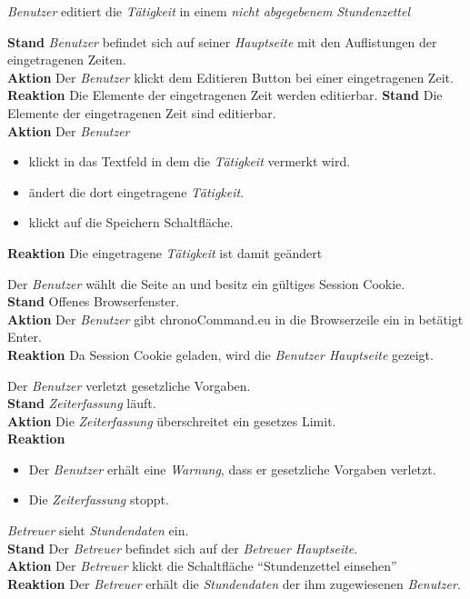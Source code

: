 \begin{requirements}
	 \emph{Benutzer} editiert die \emph{Tätigkeit} in einem \emph{nicht abgegebenem} \emph{Stundenzettel}
	\begin{requirements}
	        \textbf{Stand} \emph{Benutzer} befindet sich auf seiner \emph{Hauptseite} mit den Auflistungen der eingetragenen Zeiten. \\
	        \textbf{Aktion} Der \emph{Benutzer} klickt dem Editieren Button bei einer eingetragenen Zeit.\\
            \textbf{Reaktion} Die Elemente der eingetragenen Zeit werden editierbar.
        \textbf{Stand} Die Elemente der eingetragenen Zeit sind editierbar. \\
        \textbf{Aktion} Der \emph{Benutzer}
            \begin{itemize}
                \item klickt in das Textfeld in dem die \emph{Tätigkeit} vermerkt wird.
                \item ändert die dort eingetragene \emph{Tätigkeit}.
                \item klickt auf die Speichern Schaltfläche.
            \end{itemize}
            \textbf{Reaktion} Die eingetragene \emph{Tätigkeit} ist damit geändert
    \end{requirements}

     Der \emph{Benutzer} wählt die Seite an und besitz ein gültiges Session Cookie. \\
        \textbf{Stand} Offenes Browserfenster. \\
        \textbf{Aktion} Der \emph{Benutzer} gibt chronoCommand.eu in die Browserzeile ein in betätigt Enter. \\
        \textbf{Reaktion} Da Session Cookie geladen, wird die \emph{Benutzer Hauptseite} gezeigt.

     Der \emph{Benutzer} verletzt gesetzliche Vorgaben. \\
        \textbf{Stand} \emph{Zeiterfassung} läuft. \\
        \textbf{Aktion} Die \emph{Zeiterfassung} überschreitet ein gesetzes Limit. \\
        \textbf{Reaktion}
            \begin{itemize}
                \item Der \emph{Benutzer} erhält eine \emph{Warnung}, dass er gesetzliche Vorgaben verletzt.
                \item Die \emph{Zeiterfassung} stoppt.
            \end{itemize}

     \emph{Betreuer} sieht \emph{Stundendaten} ein. \\
        \textbf{Stand} Der \emph{Betreuer} befindet sich auf der \emph{Betreuer Hauptseite}. \\
        \textbf{Aktion} Der \emph{Betreuer} klickt die Schaltfläche "`Stundenzettel einsehen"' \\
        \textbf{Reaktion} Der \emph{Betreuer} erhält die \emph{Stundendaten} der ihm zugewiesenen \emph{Benutzer}.

\end{requirements}

